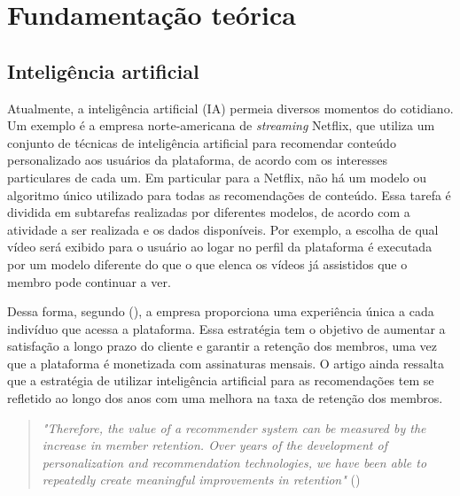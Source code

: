 
\chapter{Fundamentação teórica}

\section{Inteligência artificial}

Atualmente, a inteligência artificial (IA) permeia diversos 
momentos do cotidiano. Um exemplo é a empresa norte-americana 
de \textit{streaming} Netflix, que utiliza um conjunto de 
técnicas de inteligência artificial para recomendar conteúdo personalizado aos 
usuários da plataforma, de acordo com os interesses 
particulares de cada um. Em particular para a Netflix, 
não há um modelo ou algoritmo único utilizado 
para todas as recomendações de conteúdo. Essa tarefa é 
dividida em subtarefas realizadas por diferentes modelos, de 
acordo com a atividade a ser realizada e os dados disponíveis. 
Por exemplo, a escolha de qual vídeo será exibido para 
o usuário ao logar no perfil da plataforma é executada por um 
modelo  diferente do que o que elenca os vídeos já assistidos que o 
membro pode continuar a ver.

Dessa forma, segundo (\cite{netflix}), a empresa proporciona uma 
experiência única a cada indivíduo que acessa a plataforma. Essa 
estratégia tem o objetivo de aumentar a satisfação a longo prazo 
do cliente e garantir a retenção dos membros, uma vez 
que a plataforma é monetizada com assinaturas mensais. O artigo
ainda ressalta que a estratégia de utilizar inteligência 
artificial para as recomendações tem se refletido ao longo 
dos anos com uma melhora na taxa de retenção dos membros. 

\begin{quote}
  \textit{"Therefore, the value of a recommender system can be measured by
the increase in member retention. Over years of the development of personalization and recommendation technologies, we have been able to repeatedly create meaningful
improvements in retention"} (\cite{netflix})
\end{quote}


